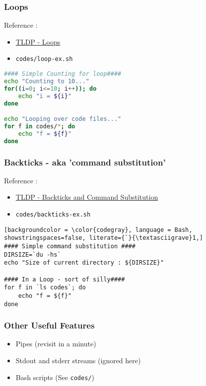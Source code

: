 \documentclass{beamer}
\newcommand{\code}[1]{\colorbox{codegray}{\texttt{#1}}}
\begin{document}
\begin{frame}[fragile]
\frametitle{Loops}
Reference :
\begin{itemize}
    \item \href{https://tldp.org/LDP/abs/html/loops1.html}{TLDP - Loops }
    \pause
    \item \code{codes/loop-ex.sh}
\end{itemize}
\begingroup
\scriptsize
\begin{lstlisting}[backgroundcolor = \color{codegray}, language = Bash, showstringspaces=false]
#### Simple Counting for loop####
echo "Counting to 10..."
for((i=0; i<=10; i++)); do
    echo "i = ${i}"
done

echo "Looping over code files..."
for f in codes/*; do
    echo "f = ${f}"
done
\end{lstlisting}
\endgroup
\end{frame}


\begin{frame}[fragile]
\frametitle{Backticks - aka 'command substitution'}
Reference :
\begin{itemize}
    \item \href{https://tldp.org/LDP/abs/html/commandsub.html}{TLDP - Backticks and Command Substitution}
    \pause
    \item \code{codes/backticks-ex.sh}
\end{itemize}
\begingroup
\scriptsize
\begin{lstlisting}[backgroundcolor = \color{codegray}, language = Bash, showstringspaces=false, literate={`}{\textasciigrave}1,]
#### Simple command substitution ####
DIRSIZE=`du -hs`
echo "Size of current directory : ${DIRSIZE}"

#### In a Loop - sort of silly####
for f in `ls codes`; do
    echo "f = ${f}"
done
\end{lstlisting}
\endgroup
\end{frame}





\begin{frame}
\frametitle{Other Useful Features}
\begin{itemize}
    \item Pipes (revisit in a minute)
    \pause
    \item Stdout and stderr streams (ignored here)
    \pause
    \item Bash scripts (See \code{codes/})
\end{itemize}
\end{frame}
\end{document}
